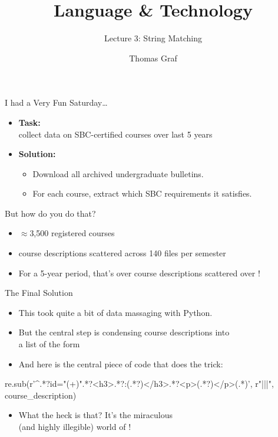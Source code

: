 \documentclass[professionalfonts, xcolor={usenames,svgnames,x11names,table}]{beamer}
\title{\texorpdfstring{Language \& Technology}{Language and Technology}}
\subtitle{Lecture 3: String Matching}
\author{Thomas Graf}
\institute{Stony Brook University\\\texttt{lin120@thomasgraf.net}}
\date{}
\begin{document}
\unnumbered{
\begin{frame}
	\titlepage
\end{frame}
}

\begin{frame}{I had a Very Fun Saturday\ldots}
    \begin{itemize}
        \item \textbf{Task:}\\
            collect data on SBC-certified courses over last 5 years
        \item \textbf{Solution:}
            \begin{itemize}
                \item Download all archived undergraduate bulletins.
                \item For each course, extract which SBC requirements it satisfies.
            \end{itemize}
    \end{itemize}

    \pause
    \begin{block}{But how do you do that?}
        \begin{itemize}
            \item $\approx$3,500 registered courses 
            \item course descriptions scattered across 140 files per semester
            \item For a 5-year period, that's over  course descriptions scattered over !
        \end{itemize}
    \end{block}
\end{frame}

\begin{frame}[fragile]{The Final Solution}
    \begin{itemize}
        \item This took quite a bit of data massaging with Python.
        \item But the central step is condensing course descriptions into\\
            a list of the form
    \end{itemize}
\begin{pythoncode}
\end{pythoncode}
    \pause
    \begin{itemize}
        \item And here is the central piece of code that does the trick:
    \end{itemize}
\begin{pythoncode}
    re.sub(r'^.*?id="(\w+)".*?<h3>.*?:\s*(.*?)</h3>.*?<p>(.*?)</p>(.*)',
           r"\1|\2|\3|\4",
           course_description)
\end{pythoncode}
    \pause
    \begin{itemize}
        \item What the heck is that? It's the miraculous\\
            (and highly illegible) world of !
    \end{itemize}
\end{frame}
\end{document}
